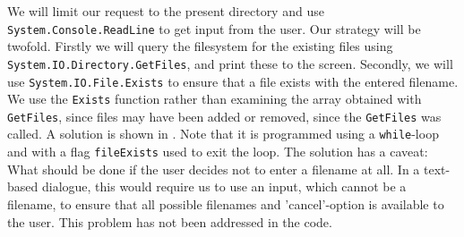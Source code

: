 \documentclass[fsharpNotes.tex]{subfiles}
\begin{document}
We will limit our request to the present directory and use \lstinline{System.Console.ReadLine} to get input from the user. Our strategy will be twofold. Firstly we will query the filesystem for the existing files using \lstinline{System.IO.Directory.GetFiles}, and print these to the screen. Secondly, we will use \lstinline{System.IO.File.Exists} to ensure that a file exists with the entered filename. We use the \lstinline{Exists} function rather than examining the array obtained with \lstinline{GetFiles}, since files may have been added or removed, since the \lstinline{GetFiles} was called. A solution is shown in .
%
%
Note that it is programmed using a \lstinline{while}-loop and with a flag \lstinline{fileExists} used to exit the loop. The solution has a caveat: What should be done if the user decides not to enter a filename at all.  In a text-based dialogue, this would require us to use an input, which cannot be a filename, to ensure that all possible filenames and 'cancel'-option is available to the user. This problem has not been addressed in the code. 

\begin{comment}
A practice problem could be,
\begin{task}
  Ask the user for the name of an existing file, read the file and print it in reverse order.
\end{task}
This could be solved as,
%
\fsCode{reverseFile}{reverseFileCode}{Ask user to input a file, and print the file in reverse order.}{}
%
\fsOutput{reverseFile}{See \Cref{reverseFileCode}.}{}%
%
\end{comment}
\end{document}
